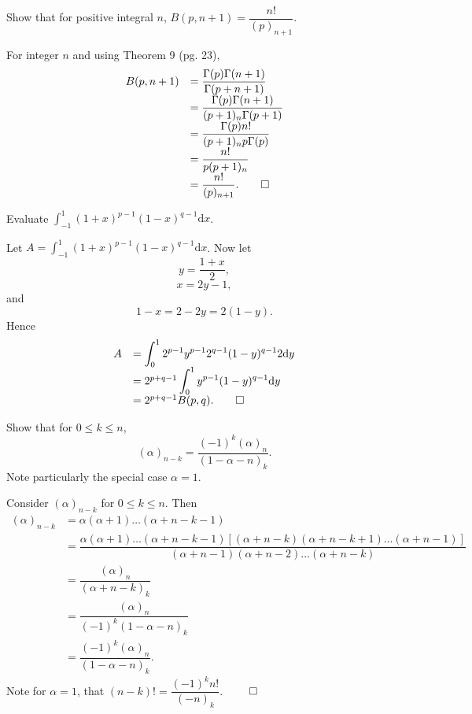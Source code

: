 \begin{problem}\label{problem6chapter2}
Show that for positive integral $n$, $B(p,n+1) = \dfrac{n!}{(p)_{n+1}}$.
\end{problem}
\begin{solution}
For integer $n$ and using Theorem 9 (pg. 23),
$$\begin{array}{ll}
B(p,n+1) &= \dfrac{\Gamma(p) \Gamma(n+1)}{\Gamma(p+n+1)} \\
&= \dfrac{\Gamma(p) \Gamma(n+1)}{(p+1)_n \Gamma(p+1)} \\
&= \dfrac{\Gamma(p) n!}{(p+1)_n p \Gamma(p)} \\
&= \dfrac{n!}{p(p+1)_n} \\
&= \dfrac{n!}{(p)_{n+1}}. \qed
\end{array}$$
\end{solution}
\begin{problem}\label{problem7chapter2}
Evaluate $\displaystyle\int_{-1}^1 (1+x)^{p-1}(1-x)^{q-1} \mathrm{d}x$.
\end{problem}
\begin{solution}
Let $A = \displaystyle\int_{-1}^1(1+x)^{p-1}(1-x)^{q-1} \mathrm{d}x$. Now let 
$$y = \dfrac{1+x}{2},$$
$$x=2y-1,$$ 
and
$$1-x=2-2y=2(1-y).$$
Hence
$$\begin{array}{ll}
A &= \displaystyle\int_0^1 2^{p-1} y^{p-1} 2^{q-1} (1-y)^{q-1} 2 \mathrm{d}y \\
&= 2^{p+q-1} \displaystyle\int_0^1 y^{p-1}(1-y)^{q-1} \mathrm{d}y \\
&= 2^{p+q-1} B(p,q). \qed
\end{array}$$
\end{solution}
\begin{problem}\label{problem8chapter2}
Show that for $0 \leq k \leq n$, 
$$(\alpha)_{n-k} = \dfrac{(-1)^k (\alpha)_n}{(1-\alpha-n)_k}.$$
Note particularly the special case $\alpha=1$.
\end{problem}
\begin{solution}
Consider $(\alpha)_{n-k}$ for $0 \leq k \leq n$. Then
$$\begin{array}{ll}
(\alpha)_{n-k} &= \alpha(\alpha+1) \ldots (\alpha+n-k-1) \\
&= \dfrac{\alpha(\alpha+1) \ldots (\alpha+n-k-1)[(\alpha+n-k)(\alpha+n-k+1)\ldots(\alpha+n-1)]}{(\alpha+n-1)(\alpha+n-2)\ldots(\alpha+n-k)} \\
&= \dfrac{(\alpha)_n}{(\alpha+n-k)_k} \\
&= \dfrac{(\alpha)_n}{(-1)^k(1-\alpha-n)_k} \\
&= \dfrac{(-1)^k (\alpha)_n}{(1-\alpha-n)_k}.
\end{array}$$
Note for $\alpha=1$, that $(n-k)! = \dfrac{(-1)^kn!}{(-n)_k}$. $\qed$
\end{solution}
